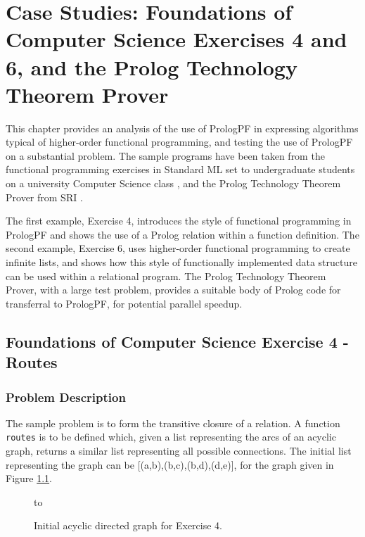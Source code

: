 \chapter[Case Studies]{Case Studies:
  Foundations of Computer Science Exercises 4 and 6, and
  the Prolog Technology Theorem Prover}
\label{case}

This chapter provides an analysis of the use of PrologPF in
expressing algorithms typical of higher-order functional programming, and
testing the use of PrologPF on a substantial problem.
The sample programs have been taken from the functional programming
exercises in Standard ML \cite{MTH90} 
set to undergraduate students on a university Computer
Science class \cite{Pau88}, and the
Prolog Technology Theorem Prover from SRI \cite{Sti88}.

The first example, Exercise 4, introduces the style of
functional programming in PrologPF
and shows the use of a Prolog relation within
a function definition.  The second example, Exercise 6, uses higher-order
functional programming to create infinite lists, and shows how this
style of functionally implemented data structure can be used within
a relational program.  The Prolog Technology Theorem Prover, with a
large test problem, provides a suitable body of Prolog code for transferral
to PrologPF, for potential parallel speedup.

\section[Exercise 4 - Routes]{Foundations of Computer Science Exercise 4 - Routes} %

\subsection{Problem Description}

The sample problem is to form the transitive closure of a relation.  A function
\texttt{routes} is to be defined which, given a list representing the arcs of an
acyclic graph, returns a similar list representing all possible connections.
The initial list representing the graph can be [(a,b),(b,c),(b,d),(d,e)], for
the graph given in Figure \ref{ex4_1}.

\begin{figure}[htb]
\vspace{5mm} \hbox to 
\caption{Initial acyclic directed graph for Exercise 4.}
\vspace{5mm}
\label{ex4_1}
\end{figure}

